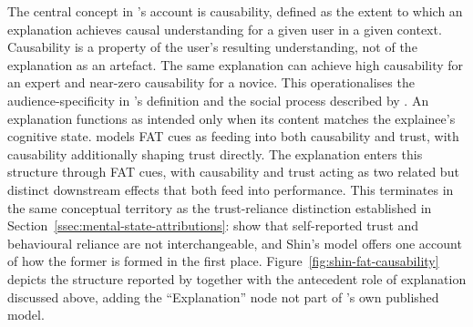 The central concept in \textcite{Shin2021}'s account is causability, defined as the extent to which an explanation achieves causal understanding for a given user in a given context. Causability is a property of the user's resulting understanding, not of the explanation as an artefact. The same explanation can achieve high causability for an expert and near-zero causability for a novice. This operationalises the audience-specificity in \textcite{Arrieta2020}'s definition and the social process described by \textcite{Miller2019}. An explanation functions as intended only when its content matches the explainee's cognitive state. \textcite{Shin2021} models \ac{FAT} cues as feeding into both causability and trust, with causability additionally shaping trust directly. The explanation enters this structure through \ac{FAT} cues, with causability and trust acting as two related but distinct downstream effects that both feed into performance. This terminates in the same conceptual territory as the trust-reliance distinction established in Section~\ref{ssec:mental-state-attributions}: \textcite{Colombatto2025} show that self-reported trust and behavioural reliance are not interchangeable, and Shin's model offers one account of how the former is formed in the first place. Figure~\ref{fig:shin-fat-causability} depicts the structure reported by \textcite{Shin2021} together with the antecedent role of explanation discussed above, adding the \enquote{Explanation} node not part of \textcite{Shin2021}'s own published model.

